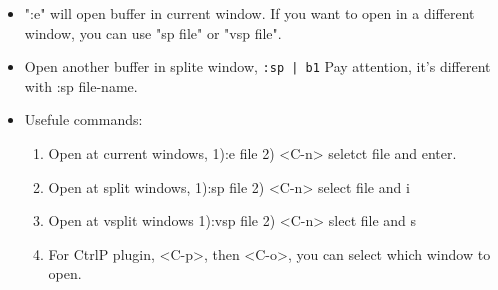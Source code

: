 \documentclass[a4paper,11pt,twoside]{book}
\begin{document}
\begin{itemize}
			\item ":e" will open buffer in current window. If you want to open in a different window, you can use "sp file" or "vsp file".

			\item Open another buffer in splite window, \texttt{:sp | b1} Pay attention, it's different with :sp file-name.

			\item Usefule commands:
				\begin{enumerate}
					\item Open at current windows, 1):e file 2) <C-n> seletct file and enter. 

					\item Open at split windows, 1):sp file 2) <C-n> select file and i

					\item Open at vsplit windows 1):vsp file 2) <C-n> slect file and s

					\item For CtrlP plugin, <C-p>, then <C-o>, you can select which window to open.
				\end{enumerate}
	\end{itemize}
\end{document}

